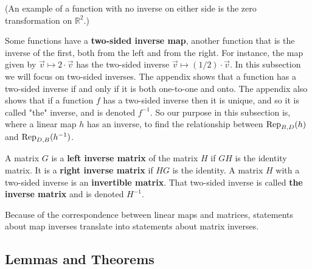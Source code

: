 (An example of a function with no inverse on either side is the zero transformation on
$\mathbb{R}^2$.)

Some functions have a \textbf{two-sided inverse map}, another function that is the inverse
of the first, both from the left and from the right. For instance, the map given by
$\vec{v}\mapsto 2\cdot \vec{v}$ has the two-sided inverse $\vec{v}\mapsto
(1/2)\cdot\vec{v}$. In this subsection we will focus on two-sided inverses. The appendix
shows that a function has a two-sided inverse if and only if it is both one-to-one and
onto. The appendix also shows that if a function $f$ has a two-sided inverse then it is
unique, and so it is called "the" inverse, and is denoted $f^{-1}$. So our purpose in this
subsection is, where a linear map $h$ has an inverse, to find the relationship between
${\rm Rep} _{B,D}(h)$ and ${\rm Rep} _{D,B}(h^{-1})$.



A matrix $G$ is a \textbf{left inverse matrix} of the matrix $H$ if $GH$ is the identity
matrix. It is a \textbf{right inverse matrix} if $HG$ is the identity. A matrix $H$ with a
two-sided inverse is an \textbf{invertible matrix}. That two-sided inverse is called
\textbf{the inverse matrix} and is denoted $H^{-1}$.



Because of the correspondence between linear maps and matrices, statements about map
inverses translate into statements about matrix inverses.




\subsection{Lemmas and Theorems}
\label{sss:lemm-1158}




